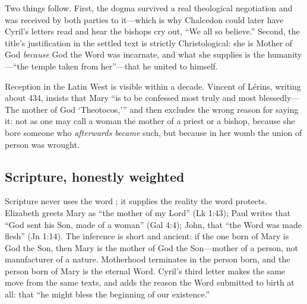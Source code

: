 Two things follow. First, the dogma survived a real theological
negotiation and was received by both parties to it---which is why
Chalcedon could later have Cyril's letters read and hear the bishops cry
out, ``We all so believe.'' Second, the title's justification in the
settled text is strictly Christological: she is Mother of God
\emph{because} God the Word was incarnate, and what she supplies is the
humanity---``the temple taken from her''---that he united to himself.

Reception in the Latin West is visible within a decade. Vincent of
L\'erins, writing about 434, insists that Mary ``is to be confessed most
truly and most blessedly---The mother of God `Theotocos,''' and then
excludes the wrong reason for saying it: not as one may call a woman the
mother of a priest or a bishop, because she bore someone who
\emph{afterwards became} such, but because in her womb the union of
person was wrought.

\subsection*{Scripture, honestly weighted}

Scripture never uses the word ; it supplies the reality
the word protects. Elizabeth greets Mary as ``the mother of my Lord''
(Lk 1:43); Paul writes that ``God sent his Son, made of a woman''
(Gal 4:4); John, that ``the Word was made flesh'' (Jn 1:14). The
inference is short and ancient: if the one born of Mary is God the Son,
then Mary is the mother of God the Son---mother of a person, not
manufacturer of a nature. Motherhood terminates in the person born, and
the person born of Mary is the eternal Word. Cyril's third letter makes
the same move from the same texts, and adds the reason the Word submitted
to birth at all: that ``he might bless the beginning of our
existence.''

